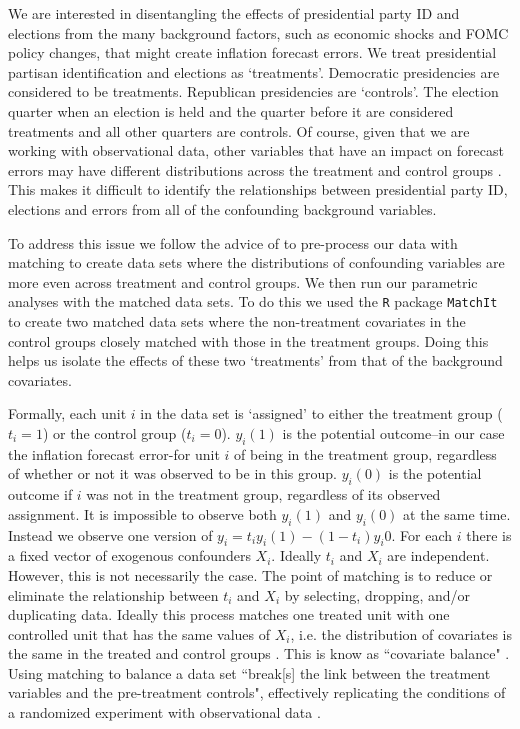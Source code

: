 \documentclass[a4paper]{article}\usepackage{graphicx, color}
\begin{document}
We are interested in disentangling the effects of presidential party ID and elections from the many background factors, such as economic shocks and FOMC policy changes, that might create inflation forecast errors. We treat presidential partisan identification and elections as `treatments'. Democratic presidencies are considered to be treatments. Republican presidencies are `controls'. The election quarter when an election is held and the quarter before it are considered treatments and all other quarters are controls. Of course, given that we are working with observational data, other variables that have an impact on forecast errors may have different distributions across the treatment and control groups \citep{Diamond2012, Cochran1973}. This makes it difficult to identify the relationships between presidential party ID, elections and errors from all of the confounding background variables.

To address this issue we follow the advice of \cite{Ho2007} to pre-process our data with matching to create data sets where the distributions of confounding variables are more even across treatment and control groups. We then run our parametric analyses with the matched data sets. To do this we used the {\tt{R}} package {\tt{MatchIt}} \citep{matchit2011} to create two matched data sets where the non-treatment covariates in the control groups closely matched with those in the treatment groups. Doing this helps us isolate the effects of these two `treatments' from that of the background covariates. 

Formally, each unit $i$ in the data set is `assigned' to either the treatment group ($t_{i} = 1$) or the control group ($t_{i} = 0$). $y_{i}(1)$ is the potential outcome--in our case the inflation forecast error-for unit $i$ of being in the treatment group, regardless of whether or not it was observed to be in this group. $y_{i}(0)$ is the potential outcome if $i$ was not in the treatment group, regardless of its observed assignment. It is impossible to observe both $y_{i}(1)$ and $y_{i}(0)$ at the same time. Instead we observe one version of $y_{i}=t_{i}y_{i}(1)-(1-t_{i})y_i{0}$. For each $i$ there is a fixed vector of exogenous confounders $X_{i}$. Ideally $t_{i}$ and $X_{i}$ are independent. However, this is not necessarily the case. The point of matching is to reduce or eliminate the relationship between $t_{i}$  and $X_{i}$ by selecting, dropping, and/or duplicating data. Ideally this process matches one treated unit with one controlled unit that has the same values of $X_{i}$, i.e. the distribution of covariates is the same in the treated and control groups \citep{matchit2011}. This is know as ``covariate balance" \cite[1]{Diamond2012}. Using matching to balance a data set ``break[s] the link between the treatment variables and the pre-treatment controls", effectively replicating the conditions of a randomized experiment with observational data \cite[][2--3]{matchit2011}. 
\end{document}

